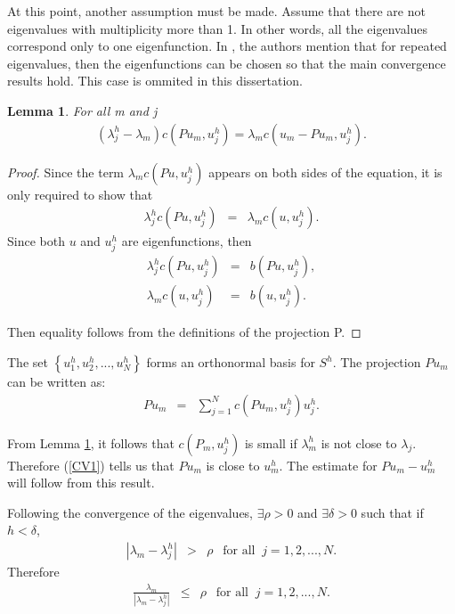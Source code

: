 \documentclass[../../main.tex]{subfiles}
\begin{document}
At this point, another assumption must be made. Assume that there are not eigenvalues with multiplicity more than 1. In other words, all the eigenvalues correspond only to one eigenfunction. In \cite{SF73}, the authors mention that for repeated eigenvalues, then the eigenfunctions can be chosen so that the main convergence results hold. This case is ommited in this dissertation.

\newtheorem{Lem_6}[Lem_1]{Lemma} 
\begin{Lem_6}
	\label{Lem_6}
	For all m and j
	\begin{eqnarray*}
	(\lambda_{j}^{h} - \lambda_{m}) c( Pu_{m}, u_{j}^{h}) = \lambda_{m} c( u_{m}-Pu_{m},u_{j}^{h} ).
	\end{eqnarray*}
\end{Lem_6}
\begin{proof}
	Since the term $\lambda_{m}c( Pu,u^{h}_{j})$ appears on both sides of the equation, it is only required to show that
	\begin{eqnarray*}
		\lambda_{j}^{h}c( Pu, u_{j}^{h} ) &=& \lambda_{m} c( u, u_{j}^{h} ).	
	\end{eqnarray*}
	Since both $u$ and $u_{j}^{h}$ are eigenfunctions, then
	\begin{eqnarray*}
		\lambda_{j}^{h}c( Pu, u_{j}^{h} ) &=& b(Pu,u_{j}^{h}),\\
		\lambda_{m} c( u, u_{j}^{h} ) &=& b(u,u_{j}^{h}).
	\end{eqnarray*}

	Then equality follows from the definitions of the projection P.
\end{proof}

The set $\left\{u_{1}^{h},u_{2}^{h},...,u_{N}^{h}\right\}$ forms an orthonormal basis for $S^{h}$. The projection $Pu_{m}$ can be written as:
\begin{eqnarray}
	Pu_{m} &=& \sum_{j=1}^{N} c( P u_{m} ,u_{j}^{h}) u_{j}^{h}. \label{CV1}
\end{eqnarray}


From Lemma \ref{Lem_6}, it follows that $c( P_{m},u_{j}^{h} )$ is small if $\lambda_{m}^{h}$ is not close to $\lambda_{j}$. Therefore (\ref{CV1}) tells us that $Pu_{m}$ is close to $u_{m}^{h}$. The estimate for $Pu_{m} - u_{m}^{h}$ will follow from this result.


Following the convergence of the eigenvalues, $\exists \rho > 0$ and $\exists \delta > 0$ such that if $h<\delta$,
\begin{eqnarray}
|\lambda_{m} - \lambda_{j}^{h}| &>& \rho \ \ \textrm{ for all } \ j = 1,2,...,N.
\end{eqnarray}
Therefore
\begin{eqnarray}
\frac{\lambda_{m}}{|\lambda_{m} - \lambda_{j}^{h}|} &\leq & \rho \ \ \textrm{ for all } \ j = 1,2,...,N.
\end{eqnarray}
\end{document}
